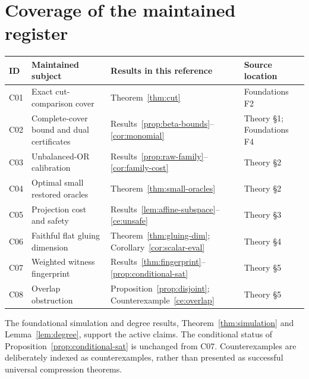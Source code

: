 \documentclass[11pt,letterpaper,oneside]{report}
\theoremstyle{komorebi}
\begin{document}
\section{Coverage of the maintained register}
\small
\begin{longtable}{@{}>{\RaggedRight\arraybackslash}p{0.40in}>{\RaggedRight\arraybackslash}p{1.77in}>{\RaggedRight\arraybackslash}p{2.24in}>{\RaggedRight\arraybackslash}p{1.40in}@{}}
\toprule
\textbf{ID} & \textbf{Maintained subject} & \textbf{Results in this reference} & \textbf{Source location}\\\midrule\endhead
C01 & Exact cut-comparison cover & Theorem~\ref{thm:cut} & Foundations F2\\
C02 & Complete-cover bound and dual certificates & Results~\ref{prop:beta-bounds}--\ref{cor:monomial} & Theory \S1; Foundations F4\\
C03 & Unbalanced-OR calibration & Results~\ref{prop:raw-family}--\ref{cor:family-cost} & Theory \S2\\
C04 & Optimal small restored oracles & Theorem~\ref{thm:small-oracles} & Theory \S2\\
C05 & Projection cost and safety & Results~\ref{lem:affine-subspace}--\ref{ce:unsafe} & Theory \S3\\
C06 & Faithful flat gluing dimension & Theorem~\ref{thm:gluing-dim}; Corollary~\ref{cor:scalar-eval} & Theory \S4\\
C07 & Weighted witness fingerprint & Results~\ref{thm:fingerprint}--\ref{prop:conditional-sat} & Theory \S5\\
C08 & Overlap obstruction & Proposition~\ref{prop:disjoint}; Counterexample~\ref{ce:overlap} & Theory \S5\\
\bottomrule
\end{longtable}
\normalsize
The foundational simulation and degree results, Theorem~\ref{thm:simulation} and Lemma~\ref{lem:degree}, support the active claims. The conditional status of Proposition~\ref{prop:conditional-sat} is unchanged from C07. Counterexamples are deliberately indexed as counterexamples, rather than presented as successful universal compression theorems.
\end{document}

